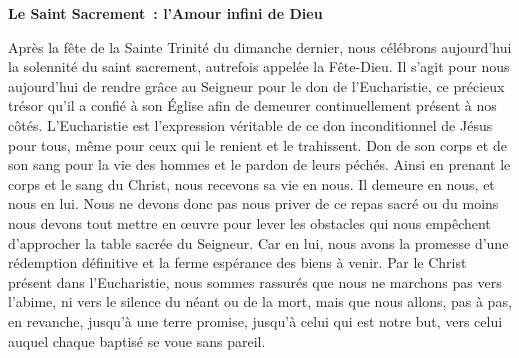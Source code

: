  \begin{center}
 \textbf{
Le Saint Sacrement : l’Amour infini de Dieu
 }
 \end{center}

Après la fête de la Sainte Trinité du dimanche dernier, nous célébrons aujourd’hui la solennité du saint sacrement, autrefois appelée la Fête-Dieu.
Il s’agit pour nous aujourd’hui de rendre grâce au Seigneur pour le don de l’Eucharistie, ce précieux trésor qu’il a confié à son Église afin de demeurer continuellement présent à nos côtés.
L’Eucharistie est l’expression véritable de ce don inconditionnel de Jésus pour tous, même pour ceux qui le renient et le trahissent.
Don de son corps et de son sang pour la vie des hommes et le pardon de leurs péchés. Ainsi en prenant le corps et le sang du Christ, nous recevons sa vie en nous. Il demeure en nous, et nous en lui. Nous ne devons donc pas nous priver de ce repas sacré ou du moins nous devons tout mettre en œuvre pour lever les obstacles qui nous empêchent d’approcher la table sacrée du Seigneur. Car en lui, nous avons la promesse d’une rédemption définitive et la ferme espérance des biens à venir. Par le Christ présent dans l’Eucharistie, nous sommes rassurés que nous ne marchons pas vers l’abime, ni vers le silence du néant ou de la mort, mais que nous allons, pas à pas, en revanche, jusqu’à une terre promise, jusqu’à celui qui est notre but, vers celui auquel chaque baptisé se voue sans pareil.

